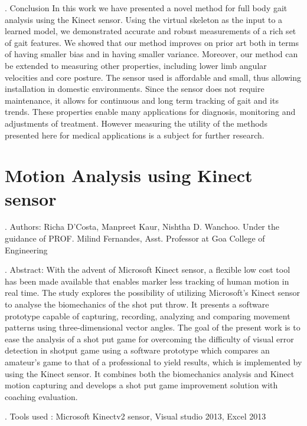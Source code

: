 . Conclusion
\noindent In this work we have presented a novel method for full body gait analysis using the Kinect sensor. Using the virtual skeleton as the input to a learned model, we demonstrated accurate and robust measurements of a rich set of gait features. We showed that our method improves on prior art both in terms of having smaller bias and in having smaller variance. Moreover, our method can be extended to measuring other properties, including lower limb angular velocities and core posture. The sensor used is affordable and small, thus allowing installation in domestic environments. Since the sensor does not require maintenance, it allows for continuous and long term tracking of gait and its trends. These properties enable many applications for diagnosis, monitoring and adjustments of treatment. However measuring the utility of the methods presented here for medical applications is a subject for further research.
\newpage

\section{Motion Analysis using Kinect sensor} \label{Motion Analysis using Kinect sensor}

. Authors:
\noindent Richa D’Costa, Manpreet Kaur, Nishtha D. Wanchoo. Under the guidance of PROF. Milind Fernandes, Asst. Professor at Goa College of Engineering

. Abstract:
\noindent With the advent of Microsoft Kinect sensor, a flexible low cost tool has been made available that enables marker less tracking of human motion in real time. The study explores the possibility of utilizing Microsoft’s Kinect sensor to analyse the biomechanics of the shot put throw. It presents a software prototype capable of capturing, recording, analyzing and comparing movement patterns using three-dimensional vector angles. The goal of the present work is to ease the analysis of a shot put game for overcoming the difficulty of visual error detection in shotput game using a software prototype which compares an amateur’s game to that of a professional to yield results, which is implemented by using the Kinect sensor. It combines both the biomechanics analysis and Kinect motion capturing and develops a shot put game improvement solution with coaching evaluation.

. Tools used :
\noindent Microsoft Kinectv2 sensor, Visual studio 2013, Excel 2013

